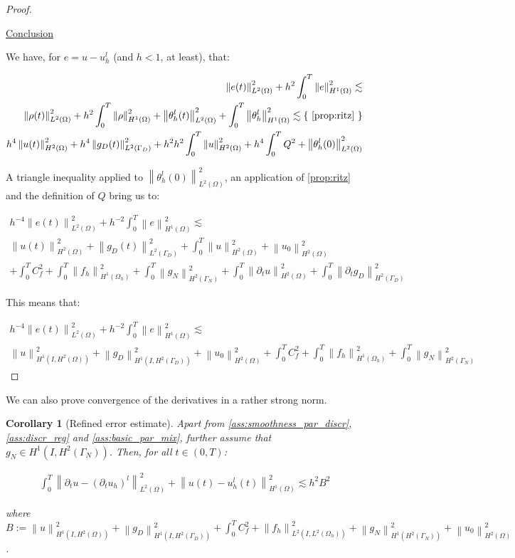 \documentclass[english,a4paper,10pt,oneside]{scrbook}	%
\theoremstyle{break}
\newtheorem{cor}[equation]{Corollary}
\newenvironment{mproof}[1][\proofname]{%
  \begin{proof}[#1]$ $\par\nobreak\ignorespaces
}{%
  \end{proof}
}
\renewcommand*{\proofname}{Proof}
\theoremstyle{remark}
\newcommand{\ds}{\displaystyle}
\newcommand{\norm}[1]{\left\lVert#1\right\rVert}
\newcommand{\ind}[1]{\{\text{ #1 }\}}
\begin{document}
\begin{mproof}
\underline{Conclusion}

We have, for $e=u-u_h^l$ (and $h<1$, at least), that:

\begin{align*}
	\norm{e(t)}_{L^2(\Omega)}^2 + h^2\int_0^T\norm{e}^2_{H^1(\Omega)} \lesssim\\
	\norm{\rho(t)}_{L^2(\Omega)}^2 + h^2\int_0^T\norm{\rho}^2_{H^1(\Omega)} 	+ \norm{\theta_h^l(t)}_{L^2(\Omega)}^2 + \int_0^T\norm{\theta_h^l}^2_{H^1(\Omega)} \lesssim \ind{\cref{prop:ritz}} \\
	 h^4 \norm{u(t)}_{H^2(\Omega)}^2 + h^4\norm{g_D(t)}_{L^2(\Gamma_D)}^2 + h^2h^2\int_0^T\norm{u}^2_{H^2(\Omega)} +  h^4\int_0^T Q^2 + \norm{\theta_h^l(0)}_{L^2(\Omega)}^2
\end{align*}

A triangle inequality applied to $\norm{\theta_h^l(0)}_{L^2(\Omega)}^2$, an application of \cref{prop:ritz} and the definition of $Q$ bring us to:


\begin{align*}
	 h^{-4}\norm{e(t)}_{L^2(\Omega)}^2 + h^{-2}\int_0^T\norm{e}^2_{H^1(\Omega)} \lesssim\\
	  \norm{u(t)}_{H^2(\Omega)}^2 + \norm{g_D(t)}_{L^2(\Gamma_D)}^2 + \int_0^T\norm{u}^2_{H^2(\Omega)} + \norm{u_0}_{H^2(\Omega)}^2 \\
	 +  \int_0^T C_f^2 + \int_0^T \norm{f_h}_{H^1(\Omega_h)}^2+  \int_0^T  \norm{g_N}_{H^2(\Gamma_N)}^2 +\int_0^T \norm{\partial_t u}_{H^2(\Omega)}^2 + \int_0^T\norm{ \partial_t g_D}_{H^2(\Gamma_D)}^2
\end{align*}

This means that:

\begin{align*}
	 h^{-4}\norm{e(t)}_{L^2(\Omega)}^2 + h^{-2}\int_0^T\norm{e}^2_{H^1(\Omega)} \lesssim\\
	 \norm{u}_{H^1(I,H^2(\Omega))}^2 + \norm{g_D}_{H^1(I,H^2(\Gamma_D))}^2 + \norm{u_0}_{H^2(\Omega)}^2 +  \int_0^T C_f^2+ \int_0^T \norm{f_h}_{H^1(\Omega_h)}^2 +  \int_0^T  \norm{g_N}_{H^2(\Gamma_N)}^2
\end{align*}

\end{mproof}

We can also prove convergence of the derivatives in a rather strong norm.

\begin{cor}[Refined error estimate]
\label{cor:L2_deriv_est}
Apart from \cref{ass:smoothness_par_discr}, \cref{ass:discr_reg} and \cref{ass:basic_par_mix}, further assume that $g_{N}\in H^1(I, H^2(\Gamma_N))$. Then, for all $t \in (0,T)$:

\begin{align*}
	\int_0^T\norm{\partial_tu - (\partial_t u_h)^l}^2_{L^2(\Omega)} + \norm{u(t)-u_h^l(t)}_{H^1(\Omega)}^2 \lesssim h^2 B^2
\end{align*}


where $B:=\ds \norm{u}_{H^1(I,H^2(\Omega))}^2 + \norm{g_D}_{H^1(I,H^2(\Gamma_D))}^2 +  \int_0^T C_f^2+  \norm{f_h}_{L^2(I,L^2(\Omega_h))}^2 +\norm{g_N}_{H^1(H^2(\Gamma_N))}^2+\norm{u_0}_{H^2(\Omega)}^2$.

\end{cor}
\end{document}
